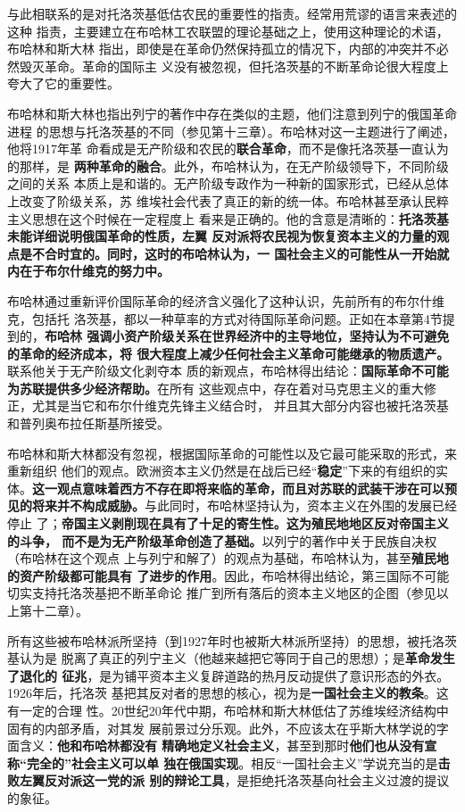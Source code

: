 与此相联系的是对托洛茨基低估农民的重要性的指责。经常用荒谬的语言来表述的这种
指责，主要建立在布哈林工农联盟的理论基础之上，使用这种理论的术语，布哈林和斯大林
指出，即使是在革命仍然保持孤立的情况下，内部的冲突并不必然毁灭革命。革命的国际主
义没有被忽视，但托洛茨基的不断革命论很大程度上夸大了它的重要性。

布哈林和斯大林也指出列宁的著作中存在类似的主题，他们注意到列宁的俄国革命进程
的思想与托洛茨基的不同（参见第十三章）。布哈林对这一主题进行了阐述，他将1917年革
命看成是无产阶级和农民的\textbf{联合革命}，而不是像托洛茨基一直认为的那样，是
\textbf{两种革命的融合}。此外，布哈林认为，在无产阶级领导下，不同阶级之间的关系
本质上是和谐的。无产阶级专政作为一种新的国家形式，已经从总体上改变了阶级关系，苏
维埃社会代表了真正的新的统一体。布哈林甚至承认民粹主义思想在这个时候在一定程度上
看来是正确的。他的含意是清晰的：\textbf{托洛茨基未能详细说明俄国革命的性质，左翼
反对派将农民视为恢复资本主义的力量的观点是不合时宜的。同时，这时的布哈林认为，一
国社会主义的可能性从一开始就内在于布尔什维克的努力中。}

布哈林通过重新评价国际革命的经济含义强化了这种认识，先前所有的布尔什维克，包括托
洛茨基，都以一种草率的方式对待国际革命问题。正如在本章第4节提到的，\textbf{布哈林
  强调小资产阶级关系在世界经济中的主导地位，坚持认为不可避免的革命的经济成本，将
  很大程度上减少任何社会主义革命可能继承的物质遗产。}联系他关于无产阶级文化剥夺本
质的新观点，布哈林得出结论：\textbf{国际革命不可能为苏联提供多少经济帮助。}在所有
这些观点中，存在着对马克思主义的重大修正，尤其是当它和布尔什维克先锋主义结合时，
并且其大部分内容也被托洛茨基和普列奥布拉任斯基所接受。

布哈林和斯大林都没有忽视，根据国际革命的可能性以及它最可能采取的形式，来重新组织
他们的观点。欧洲资本主义仍然是在战后已经“\textbf{稳定}”下来的有组织的实
体。\textbf{这一观点意味着西方不存在即将来临的革命，而且对苏联的武装干涉在可以预
  见的将来并不构成威胁。}与此同时，布哈林坚持认为，资本主义在外围的发展已经停止
了；\textbf{帝国主义剥削现在具有了十足的寄生性。这为殖民地地区反对帝国主义的斗争，
  而不是为无产阶级革命创造了基础。}以列宁的著作中关于民族自决权（布哈林在这个观点
上与列宁和解了）的观点为基础，布哈林认为，甚至\textbf{殖民地的资产阶级都可能具有
  了进步的作用}。因此，布哈林得出结论，第三国际不可能切实支持托洛茨基把不断革命论
推广到所有落后的资本主义地区的企图（参见以上第十二章）。

所有这些被布哈林派所坚持（到1927年时也被斯大林派所坚持）的思想，被托洛茨基认为是
脱离了真正的列宁主义（他越来越把它等同于自己的思想）；是\textbf{革命发生了退化的
  征兆}，是为铺平资本主义复辟道路的热月反动提供了意识形态的外衣。1926年后，托洛茨
基把其反对者的思想的核心，视为是\textbf{一国社会主义的教条}。这有一定的合理
性。20世纪20年代中期，布哈林和斯大林低估了苏维埃经济结构中固有的内部矛盾，对其发
展前景过分乐观。此外，不应该太在乎斯大林学说的字面含义：\textbf{他和布哈林都没有
  精确地定义社会主义}，甚至到那时\textbf{他们也从没有宣称“完全的”社会主义可以单
  独在俄国实现}。相反“一国社会主义”学说充当的是\textbf{击败左翼反对派这一党的派
  别的辩论工具}，是拒绝托洛茨基向社会主义过渡的提议的象征。

